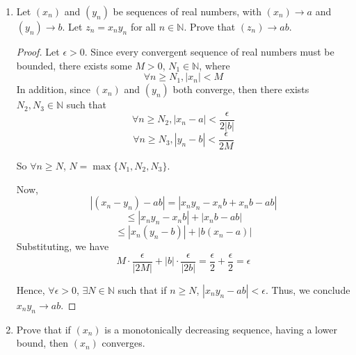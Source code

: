 \documentclass[12pt]{article}
\newcommand{\N}{\mathbb{N}}
\begin{document}
\begin{enumerate}
\item Let $(x_n)$ and $(y_n)$ be sequences of real numbers, with $(x_n)\to a$ and $(y_n)\to b$. Let $z_n=x_ny_n$ for all $n\in \N$. Prove that $(z_n)\to ab$.

\begin{proof}
Let $\epsilon > 0$. Since every convergent sequence of real numbers must be bounded, there exists some $M > 0$, $N_1 \in \N$, where 
$$\forall n \geq N_1, |x_n| < M$$
In addition, since $(x_n)$ and $(y_n)$ both converge, then there exists $N_2, N_3 \in \N$ such that 
$$\forall n \geq N_2, |x_n - a| < \frac{\epsilon}{2|b|}$$
$$\forall n \geq N_3, |y_n - b| < \frac{\epsilon}{2M}$$

So $\forall n \geq N$, $N = \max\{N_1, N_2, N_3\}$.

Now, $$|(x_n - y_n) - ab| = |x_ny_n - x_nb + x_nb - ab|$$
$$\leq |x_ny_n -x_nb| + |x_nb-ab|$$
$$\leq |x_n(y_n-b)| + |b(x_n-a)|$$
Substituting, we have
$$M \cdot \frac{\epsilon}{|2M|} + |b| \cdot \frac{\epsilon}{|2b|} = \frac{\epsilon}{2} +\frac{\epsilon}{2} = \epsilon$$

Hence, $\forall \epsilon > 0$, $\exists N \in \N$ such that if $n \geq N$, $|x_ny_n - ab| < \epsilon$.
Thus, we conclude $x_ny_n\to ab$.
\end{proof}

\item Prove that if $(x_n)$ is a monotonically decreasing sequence, having a lower bound, then $(x_n)$ converges.


\end{enumerate}
\end{document}
